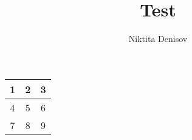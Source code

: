 \documentclass{article}
\title{Test}
\author{Niktita Denisov}
\begin{document}
\maketitle
\begin{tabular}{|c|c|c|}
\hline
1 & 2 & 3\\
\hline
4 & 5 & 6\\
\hline
7 & 8 & 9\\
\hline
\end{tabular}
\end{document}
